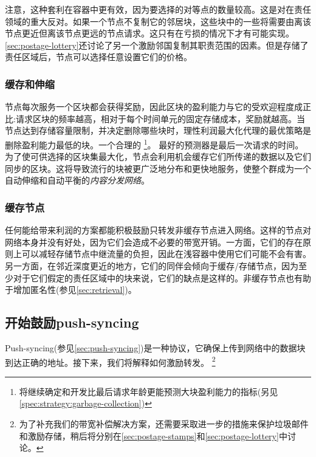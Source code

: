 注意，这种套利在容器中更有效，因为要选择的对等点的数量较高。这是对在责任领域的重大反对。如果一个节点不复制它的邻居块，这些块中的一些将需要由离该节点更近但离该节点更远的节点请求。这只有在亏损的情况下才有可能实现。\ref{sec:postage-lottery}还讨论了另一个激励邻国复制其职责范围的因素。但是存储了责任区域后，节点可以选择任意设置它们的价格。 


\subsubsection{缓存和伸缩}\label{sec:caching}

节点每次服务一个区块都会获得奖励，因此区块的盈利能力与它的受欢迎程度成正比:请求区块的频率越高，相对于每个时间单元的固定存储成本，奖励就越高。当节点达到存储容量限制，并决定删除哪些块时，理性利润最大化代理的最优策略是删除盈利能力最低的块。一个合理的%
%
\footnote{将继续确定和开发比最后请求年龄更能预测大块盈利能力的指标(另见\ref{spec:strategy:garbage-collection})}。
最好的预测器是最后一次请求的时间。为了使可供选择的区块集最大化，节点会利用机会缓存它们所传递的数据以及它们同步的区块。这将导致流行的块被更广泛地分布和更快地服务，使整个群成为一个自动伸缩和自动平衡的\emph{内容分发网络}。


\subsubsection{缓存节点}

任何能给带来利润的方案都能积极鼓励只转发非缓存节点进入网络。这样的节点对网络本身并没有好处，因为它们会造成不必要的带宽开销。一方面，它们的存在原则上可以减轻存储节点中继流量的负担，因此在浅容器中使用它们可能不会有害。另一方面，在邻近深度更近的地方，它们的同伴会倾向于缓存/存储节点，因为至少对于它们假定的责任区域中的块来说，它们的缺点是这样的。非缓存节点也有助于增加匿名性(参见\ref{sec:retrieval})。

\subsection{开始鼓励push-syncing\statusgreen}\label{sec:push-sync-incentives}

\green{}

Push-syncing(参见\ref{sec:push-syncing})是一种协议，它确保上传到网络中的数据块到达正确的地址。接下来，我们将解释如何激励转发。
%
%
\footnote{为了补充我们的带宽补偿解决方案，还需要采取进一步的措施来保护垃圾邮件和激励存储，稍后将分别在\ref{sec:postage-stamps}和\ref{sec:postage-lottery}中讨论。}



